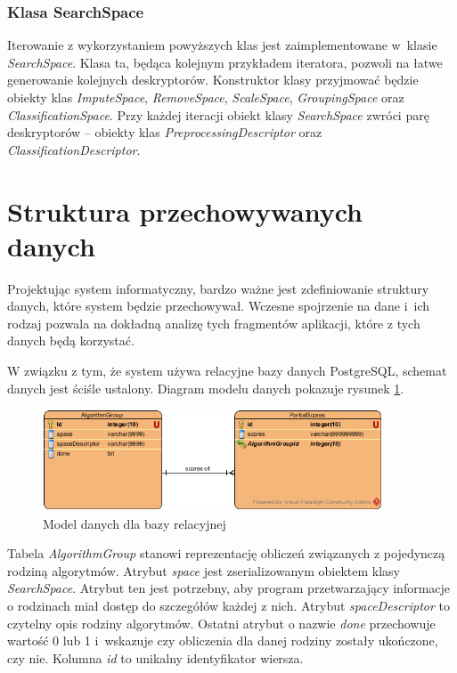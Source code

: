 \documentclass[../thesis.tex]{subfiles}
\begin{document}
\subsubsection{Klasa SearchSpace}

Iterowanie z wykorzystaniem powyższych klas jest zaimplementowane w~klasie \emph{SearchSpace}. Klasa ta, będąca kolejnym przykładem iteratora, pozwoli na łatwe generowanie kolejnych deskryptorów. Konstruktor klasy przyjmować będzie obiekty klas \emph{ImputeSpace}, \emph{RemoveSpace}, \emph{ScaleSpace}, \emph{GroupingSpace} oraz \emph{ClassificationSpace}. Przy każdej iteracji obiekt klasy \emph{SearchSpace} zwróci parę deskryptorów -- obiekty klas \emph{PreprocessingDescriptor} oraz \emph{ClassificationDescriptor}.

\section{Struktura przechowywanych danych}

Projektując system informatyczny, bardzo ważne jest zdefiniowanie struktury danych, które system będzie przechowywał. Wczesne spojrzenie na dane i~ich rodzaj pozwala na dokładną analizę tych fragmentów aplikacji, które z tych danych będą korzystać. 

W związku z tym, że system używa relacyjne bazy danych PostgreSQL, schemat danych jest ściśle ustalony. Diagram modelu danych pokazuje rysunek \ref{proj:diagram_data}.

\begin{figure}[h]
\centering
\includegraphics[width=0.9\textwidth]{data_diagram.png}
\caption{Model danych dla bazy relacyjnej}
\label{proj:diagram_data}
\end{figure}

Tabela \emph{AlgorithmGroup} stanowi reprezentację obliczeń związanych z pojedynczą rodziną algorytmów. Atrybut \emph{space} jest zserializowanym obiektem klasy \emph{SearchSpace}. Atrybut ten jest potrzebny, aby program przetwarzający informacje o rodzinach miał dostęp do szczegółów każdej z nich. Atrybut \emph{spaceDescriptor} to czytelny opis rodziny algorytmów. Ostatni atrybut o nazwie \emph{done} przechowuje wartość 0 lub 1 i~wskazuje czy obliczenia dla danej rodziny zostały ukończone, czy nie. Kolumna \emph{id} to unikalny identyfikator wiersza.
\end{document}
